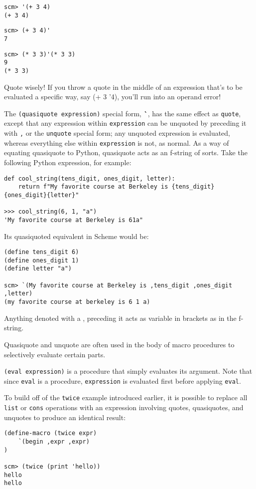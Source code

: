 \begin{lstlisting}
scm> '(+ 3 4)
(+ 3 4)
\end{lstlisting}
\begin{lstlisting}
scm> (+ 3 4)'
7
\end{lstlisting}
\begin{lstlisting}
scm> (* 3 3)'(* 3 3)
9
(* 3 3)
\end{lstlisting}
Quote wisely! If you throw a quote in the middle of an expression that's to be evaluated a specific way, say (+ 3 '4), you'll run into an operand error!

The \texttt{(quasiquote expression)} special form, \textbf{\`}, has the same effect as \texttt{quote}, except that any expression within \texttt{expression} can be unquoted by preceding it with \texttt{,} or the \texttt{unquote} special form; any unquoted expression is evaluated, whereas everything else within \texttt{expression} is not, as normal. 
As a way of equating quasiquote to Python, quasiquote acts as an f-string of sorts. Take the following Python expression, for example:

\begin{lstlisting}
def cool_string(tens_digit, ones_digit, letter):
    return f"My favorite course at Berkeley is {tens_digit}{ones_digit}{letter}"

>>> cool_string(6, 1, "a")
'My favorite course at Berkeley is 61a"
\end{lstlisting}

Its quasiquoted equivalent in Scheme would be:

\begin{lstlisting}
(define tens_digit 6)
(define ones_digit 1)
(define letter "a")

scm> `(My favorite course at Berkeley is ,tens_digit ,ones_digit ,letter)
(my favorite course at berkeley is 6 1 a)
\end{lstlisting}

Anything denoted with a , preceding it acts as variable in brackets as in the f-string.


Quasiquote and unquote are often used in the body of macro procedures to selectively evaluate certain parts. 

\texttt{(eval expression)} is a procedure that simply evaluates its argument. Note that since \texttt{eval} is a procedure, \texttt{expression} is evaluated first before applying \texttt{eval}.

To build off of the \texttt{twice} example introduced earlier, it is possible to replace all \texttt{list} or \texttt{cons} operations with an expression involving quotes, quasiquotes, and unquotes to produce an identical result:

\begin{lstlisting}
(define-macro (twice expr)
    `(begin ,expr ,expr)
)

scm> (twice (print 'hello))
hello
hello
\end{lstlisting}
